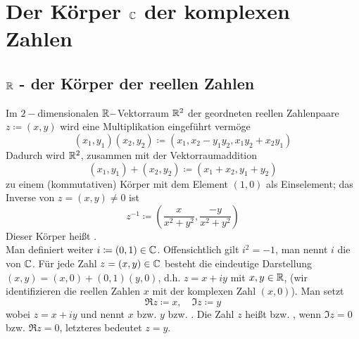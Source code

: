 \chapter{Der K\"orper $ \mathbb{C} $ der komplexen Zahlen}
\section*{$ \mathbb{R} $ - der K\"orper der reellen Zahlen}
Im $ 2- $dimensionalen $ \mathbb{R}- $Vektorraum $ \mathbb{R}^2 $ der geordneten reellen Zahlenpaare $ z\coloneqq(x,y) $ wird eine Multiplikation eingef\"uhrt verm\"oge
\[ (x_1,y_1)(x_2,y_2)\coloneqq(x_1,x_2-y_1y_2, x_1y_2+x_2y_1) \]
Dadurch wird $ \mathbb{R}^2 $, zusammen mit der Vektorraumaddition
\[ (x_1,y_1)+(x_2,y_2)\coloneqq (x_1+x_2,y_1+y_2) \]
zu einem (kommutativen) K\"orper mit dem Element $ (1,0) $ als Einselement; das Inverse von $ z=(x,y)\neq 0 $ ist
\[ z^{-1}\coloneqq\left(\frac{x}{x^2+y^2},\frac{-y}{x^2+y^2}\right) \]
Dieser K\"orper hei\ss t .\\
Man definiert weiter $ i\coloneqq (0,1)\in\mathbb{C} $. Offensichtlich gilt $ i^2=-1 $, man nennt $ i $ die  von $ \mathbb{C} $. F\"ur jede Zahl $ z=(x,y)\in\mathbb{C} $ besteht die eindeutige Darstellung $ (x,y)=(x,0)+(0,1)(y,0) $, d.h. $ z=x+iy $ mit $ x,y\in\mathbb{R} $, (wir identifizieren die reellen Zahlen $ x $ mit der komplexen Zahl $ (x,0) $). Man setzt
\[ \Re z\coloneqq x,\quad \Im z\coloneqq y \]
wobei $ z=x+iy $ und nennt $ x $ bzw. $ y $  bzw. . Die Zahl $ z $ hei\ss t  bzw. , wenn $ \Im z=0 $ bzw. $ \Re z = 0 $, letzteres bedeutet $ z=y $.
